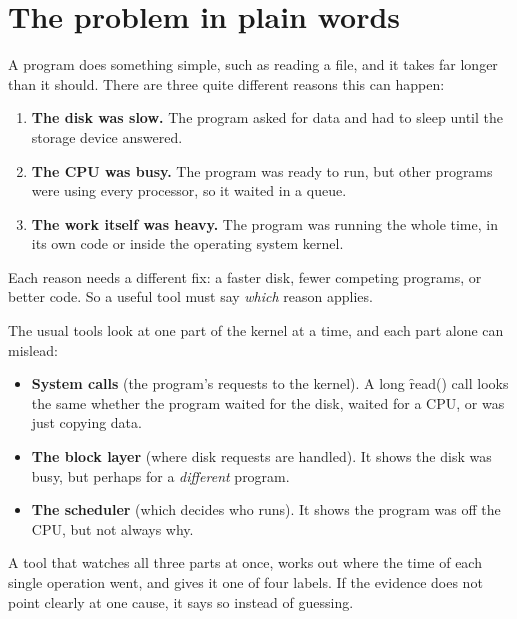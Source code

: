 \documentclass[11pt]{article}
\begin{document}

\section{The problem in plain words}

A program does something simple, such as reading a file, and it takes far longer than it should. There are three quite different reasons this can happen:

\begin{enumerate}
\item \textbf{The disk was slow.} The program asked for data and had to sleep until the storage device answered.
\item \textbf{The CPU was busy.} The program was ready to run, but other programs were using every processor, so it waited in a queue.
\item \textbf{The work itself was heavy.} The program was running the whole time, in its own code or inside the operating system kernel.
\end{enumerate}

Each reason needs a different fix: a faster disk, fewer competing programs, or better code. So a useful tool must say \emph{which} reason applies.

The usual tools look at one part of the kernel at a time, and each part alone can mislead:

\begin{itemize}
\item \textbf{System calls} (the program's requests to the kernel). A long \f{read()} call looks the same whether the program waited for the disk, waited for a CPU, or was just copying data.
\item \textbf{The block layer} (where disk requests are handled). It shows the disk was busy, but perhaps for a \emph{different} program.
\item \textbf{The scheduler} (which decides who runs). It shows the program was off the CPU, but not always why.
\end{itemize}

\begin{keyidea}
A tool that watches all three parts at once, works out where the time of each single operation went, and gives it one of four labels. If the evidence does not point clearly at one cause, it says so instead of guessing.
\end{keyidea}
\end{document}
